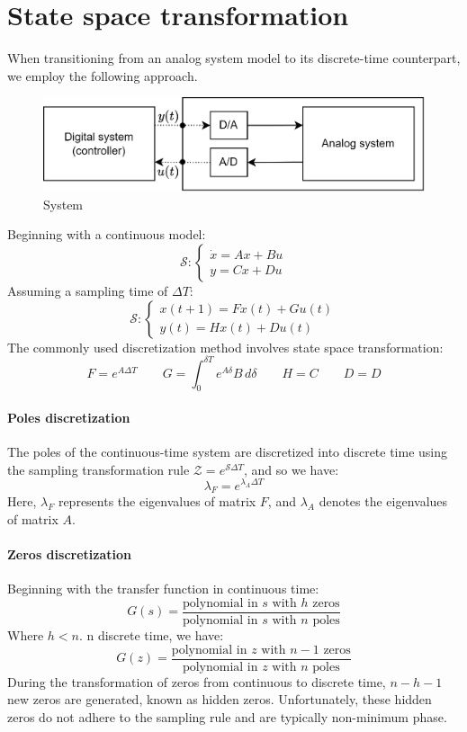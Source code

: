 \section{State space transformation}

When transitioning from an analog system model to its discrete-time counterpart, we employ the following approach. 
\begin{figure}[H]
    \centering
    \includegraphics[width=0.5\linewidth]{images/sys.png}
    \caption{System}
\end{figure}
Beginning with a continuous model:
\[\mathcal{S}:\begin{cases} \dot{x}=Ax+Bu \\ y=Cx+Du \end{cases}\]
Assuming a sampling time of $\Delta T$: 
\[\mathcal{S}:\begin{cases} x(t+1)=Fx(t)+Gu(t) \\ y(t)=Hx(t)+Du(t) \end{cases}\]
The commonly used discretization method involves state space transformation:
\[F=e^{A\Delta T} \qquad G=\int_0^{\delta T}e^{A\delta}B \,d\delta\qquad H=C \qquad D=D\]

\paragraph*{Poles discretization}
The poles of the continuous-time system are discretized into discrete time using the sampling transformation rule $\mathcal{Z}=e^{\mathcal{S}\Delta T}$, and so we have: 
\[\lambda_F=e^{\lambda_A\Delta T}\]
Here, $\lambda_F$ represents the eigenvalues of matrix $F$, and $\lambda_A$ denotes the eigenvalues of matrix $A$.

\paragraph*{Zeros discretization}
Beginning with the transfer function in continuous time:
\[G(s)=\dfrac{\text{polynomial in }s\text{ with }h \text{ zeros}}{\text{polynomial in }s\text{ with }n \text{ poles}}\]
Where $h<n$. 
n discrete time, we have:
\[G(z)=\dfrac{\text{polynomial in }z\text{ with }n-1 \text{ zeros}}{\text{polynomial in }z\text{ with }n \text{ poles}}\]
During the transformation of zeros from continuous to discrete time, $n-h-1$ new zeros are generated, known as hidden zeros.
Unfortunately, these hidden zeros do not adhere to the sampling rule and are typically non-minimum phase.